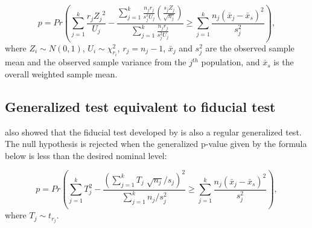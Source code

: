 \begin{equation} \label{Pval}
p=Pr \left( \sum_{j=1}^k  \frac{r_j {Z_j}^2}{U_j}  
- \frac {  \displaystyle\sum_{j=1}^k \frac{ n_j r_j } {s_j^2 U_j}  \left(
\frac{s_j Z_j}{\sqrt{n_j}} \right)  }
{ \sum_{j=1}^k \frac{ n_j r _j } {s_j^2 U_j} } 
\geq \sum_{j=1}^k \frac{n_j \left(\bar{x}_j - \bar{x}_s \right)^2 }{s_j^2}  \right) ,
\end{equation}
where $Z_i \sim N(0,1)$, $U_i \sim \chi_{r_i}^2$, 
$r_j = n_j -1$,
$\bar{x}_j$ and $s_j^2$ are the observed sample mean and the observed sample variance from the $j^{th}$ population, and $\bar{x}_s$ is the overall weighted sample mean.

\subsection{Generalized test equivalent to  fiducial test}
\cite{weerahandi2019} also showed that the fiducial test developed by \cite{li2011} is also a regular generalized test. The null hypothesis is rejected when the generalized p-value given by the formula below is less than the desired nominal level:

\begin{equation} \label{Pval2}
p=Pr \left(\sum_{j=1}^k  T_j^2 
-  \frac{ (\sum_{j=1}^k T_j \sqrt[]{n_j} /s_j )^2}
{\sum_{j=1}^k n_j/s_j^2}  \geq \sum_{j=1}^k \frac{n_j \left(\bar{x}_j - \bar{x}_s \right)^2 }{s_j^2}  \right) ,
\end{equation}
where $T_j \sim t_{r_j}$.


